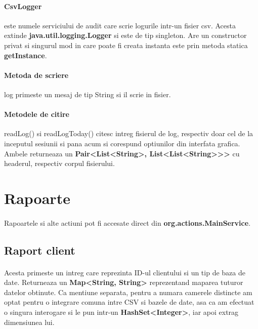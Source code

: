 \documentclass[oneside]{article}
\begin{document}
\paragraph{CsvLogger} este numele serviciului de audit care scrie logurile intr-un fisier csv. Acesta extinde \textbf{java.util.logging.Logger} si este de tip singleton. Are un constructor privat si singurul mod in care poate fi creata instanta este prin metoda statica \textbf{getInstance}.

\paragraph{Metoda de scriere} log primeste un mesaj de tip String si il scrie in fisier.

\paragraph{Metodele de citire} readLog() si readLogToday() citesc intreg fisierul de log, respectiv doar cel de la inceputul sesiunii si pana acum si corespund optiunilor din interfata grafica. Ambele returneaza un \textbf{Pair<List<String>, List<List<String>{}>{}>} cu headerul, respectiv corpul fisierului.

\section[Rapoarte]{Rapoarte}
\paragraph{} Rapoartele si alte actiuni pot fi accesate direct din \textbf{org.actions.MainService}.

\subsection[Raport client]{Raport client}
\paragraph{} Acesta primeste un intreg care reprezinta ID-ul clientului si un tip de baza de date. Returneaza un \textbf{Map<String, String>} reprezentand maparea tuturor datelor obtinute. Ca mentiune separata, pentru a numara camerele distincte am optat pentru o integrare comuna intre CSV si bazele de date, asa ca am efectuat o singura interogare si le pun intr-un \textbf{HashSet<Integer>}, iar apoi extrag dimensiunea lui.
\end{document}
